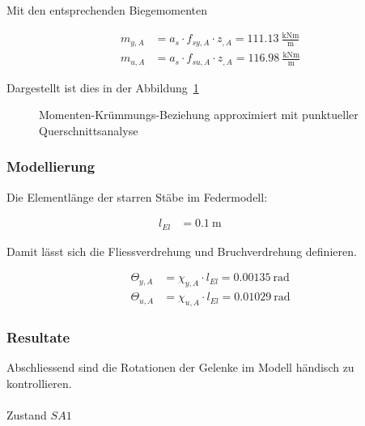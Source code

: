 \documentclass[
  11pt,
  letterpaper,
]{scrreprt}
\makeatletter
\let\oldparagraph\paragraph
\renewcommand{\paragraph}{
    \@ifstar
      \xxxParagraphStar
      \xxxParagraphNoStar
  }
\newcommand{\xxxParagraphStar}[1]{\oldparagraph*{#1}\mbox{}}
\newcommand{\xxxParagraphNoStar}[1]{\oldparagraph{#1}\mbox{}}
\makeatother
\begin{document}
Mit den entsprechenden Biegemomenten

\[
\begin{aligned}
m_{y , A}& = a_{s} \cdot f_{sy , A} \cdot z_{, A} = 111.13 \ \frac{\mathrm{kNm}}{\mathrm{m}} \\ 
m_{u , A}& = a_{s} \cdot f_{su , A} \cdot z_{, A} = 116.98 \ \frac{\mathrm{kNm}}{\mathrm{m}} \end{aligned}
\]

Dargestellt ist dies in der Abbildung~\ref{fig-jag_m_chi_b500a}

\begin{figure}[H]


\caption{\label{fig-jag_m_chi_b500a}Momenten-Krümmungs-Beziehung
approximiert mit punktueller Querschnittsanalyse}

\end{figure}%

\subsubsection{Modellierung}\label{modellierung}

Die Elementlänge der starren Stäbe im Federmodell:

\[
\begin{aligned}
l_{El}& = 0.1 \ \mathrm{m} \quad &  \quad &  
 \end{aligned}
\]

Damit lässt sich die Fliessverdrehung und Bruchverdrehung definieren.

\[
\begin{aligned}
\Theta_{y , A}& = \chi_{y , A} \cdot l_{El} = 0.00135 \ \mathrm{rad} \\ 
\Theta_{u , A}& = \chi_{u , A} \cdot l_{El} = 0.01029 \ \mathrm{rad} \end{aligned}
\]

\subsubsection{Resultate}\label{resultate}

Abschliessend sind die Rotationen der Gelenke im Modell händisch zu
kontrollieren.

\paragraph{\texorpdfstring{Zustand
\(SA1\)}{Zustand SA1}}\label{zustand-sa1}
\end{document}
